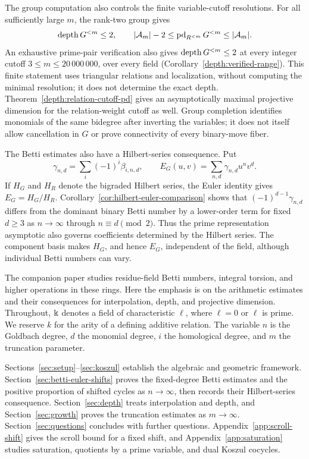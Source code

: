 The group computation also controls the finite variable-cutoff
resolutions. For all sufficiently large $m$, the rank-two group gives
\[
 \operatorname{depth} G^{<m}\le2,\qquad
 |\mathcal A_m|-2\le\operatorname{pd}_{R^{<m}}G^{<m}\le|\mathcal A_m|.
\]
An exhaustive prime-pair verification also gives
$\operatorname{depth} G^{<m}\le2$ at every integer cutoff
$3\le m\le20\,000\,000$, over every field
(Corollary~\ref{depth:verified-range}). This finite statement uses
triangular relations and localization, without computing the minimal
resolution; it does not determine the exact depth.
Theorem~\ref{depth:relation-cutoff-pd} gives an asymptotically maximal
projective dimension for the relation-weight cutoff as well.
Group completion identifies monomials of the same bidegree after
inverting the variables; it does not itself allow cancellation in $G$
or prove connectivity of every binary-move fiber.

The Betti estimates also have a Hilbert-series consequence. Put
\[
 \gamma_{n,d}=\sum_i(-1)^i\beta_{i,n,d},\qquad
 E_G(u,v)=\sum_{n,d}\gamma_{n,d}u^nv^d.
\]
If $H_G$ and $H_R$ denote the bigraded Hilbert series, the Euler
identity gives $E_G=H_G/H_R$. Corollary~\ref{cor:hilbert-euler-comparison}
shows that $(-1)^{d-1}\gamma_{n,d}$ differs from the dominant binary
Betti number by a lower-order term for fixed $d\ge3$ as
$n\to\infty$ through $n\equiv d\pmod2$. Thus the prime
representation asymptotic also governs coefficients determined by the
Hilbert series. The component basis makes $H_G$, and hence $E_G$,
independent of the field, although individual Betti numbers can vary.

The companion paper \cite{CompanionTopology} studies residue-field
Betti numbers, integral torsion, and higher operations in these rings.
Here the emphasis is on the arithmetic estimates and their consequences
for interpolation, depth, and projective dimension.
Throughout, $\Bbbk$ denotes a field of characteristic $\ell$, where
$\ell=0$ or $\ell$ is prime. We reserve $k$ for the arity of a
defining additive relation. The variable $n$ is the Goldbach degree, $d$ the monomial degree, $i$ the
homological degree, and $m$ the truncation parameter.

Sections~\ref{sec:setup}--\ref{sec:koszul} establish the algebraic and
geometric framework. Section~\ref{sec:betti-euler-shifts} proves the
fixed-degree Betti estimates and the positive proportion of shifted
cycles as $n\to\infty$, then records their Hilbert-series consequence.
Section~\ref{sec:depth} treats interpolation and depth, and
Section~\ref{sec:growth} proves the truncation estimates as $m\to\infty$.
Section~\ref{sec:questions} concludes with further questions.
Appendix~\ref{app:scroll-shift} gives the scroll bound for a fixed
shift, and Appendix~\ref{app:saturation} studies saturation, quotients
by a prime variable, and dual Koszul cocycles.
